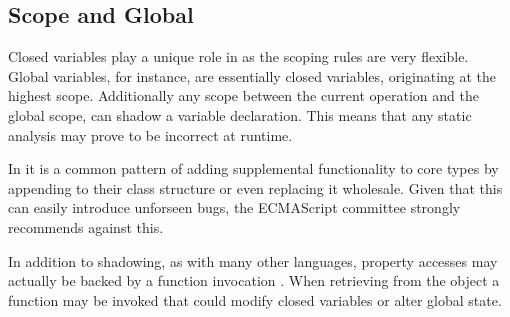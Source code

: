 \subsection{Scope and Global}

Closed variables play a unique role in \javascript as the scoping rules are very flexible.  Global variables, for instance, are essentially closed variables, originating at the highest scope.  Additionally any scope between the current operation and the global scope, can shadow a variable declaration.  This means that any static analysis may prove to be incorrect at runtime.  

In \javascript it is a common pattern of adding supplemental functionality to core types by appending to their class structure or even replacing it wholesale.  Given that this can easily introduce unforseen bugs, the ECMAScript committee strongly recommends against this. \cite{prototypeext16}

In addition to shadowing, as with many other languages, property accesses  may actually be backed by a function invocation \cite{getter16}.  When retrieving  from the object  a function may be invoked that could modify closed variables or alter global state.  